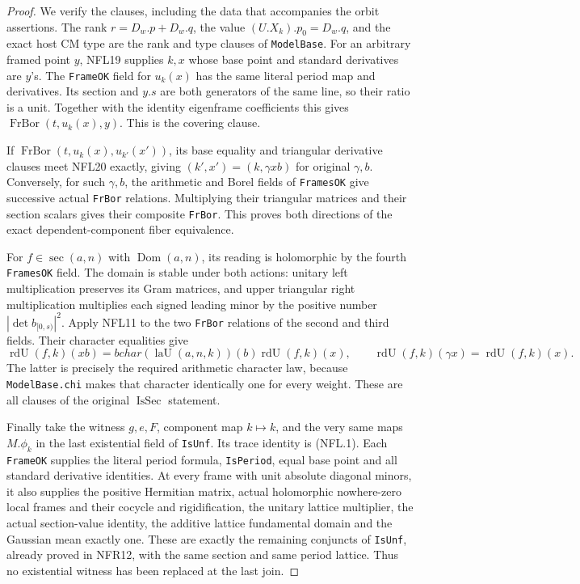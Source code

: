 \begin{proof}
We verify the clauses, including the data that accompanies the
orbit assertions.  The rank $r=D_w.p+D_w.q$, the value
$(U.X_k).p_0=D_w.q$, and the exact host CM type are the rank
and type clauses of \texttt{ModelBase}.
For an arbitrary framed point $y$, NFL19 supplies $k,x$ whose
base point and standard derivatives are $y$'s.  The
\texttt{FrameOK} field for $u_k(x)$ has the same literal
period map and derivatives.  Its section and $y.s$ are both
generators of the same line, so their ratio is a unit.
Together with the identity eigenframe coefficients this gives
$\operatorname{FrBor}(t,u_k(x),y)$.  This is the covering clause.

If $\operatorname{FrBor}(t,u_k(x),u_{k'}(x'))$, its base equality
and triangular derivative clauses meet NFL20 exactly, giving
$(k',x')=(k,\gamma xb)$ for original $\gamma,b$.
Conversely, for such $\gamma,b$, the arithmetic and Borel
fields of \texttt{FramesOK} give successive actual
\texttt{FrBor} relations.  Multiplying their triangular
matrices and their section scalars gives their composite
\texttt{FrBor}.  This proves both directions of the exact
dependent-component fiber equivalence.

For $f\in\operatorname{sec}(a,n)$ with $\operatorname{Dom}(a,n)$,
its reading is holomorphic by the fourth \texttt{FramesOK}
field.  The domain is stable under both actions: unitary
left multiplication preserves its Gram matrices, and upper
triangular right multiplication multiplies each signed leading
minor by the positive number $|\det b_{[0,s)}|^2$.
Apply NFL11 to the two \texttt{FrBor} relations of the second
and third fields.  Their character equalities give
\[
 \operatorname{rdU}(f,k)(xb)=bchar(\operatorname{laU}(a,n,k))(b)
                              \operatorname{rdU}(f,k)(x),
 \qquad
 \operatorname{rdU}(f,k)(\gamma x)=\operatorname{rdU}(f,k)(x).
 \tag{NFL.28}
\]
The latter is precisely the required arithmetic character law,
because \texttt{ModelBase.chi} makes that character identically
one for every weight.  These are all clauses of the original
$\operatorname{IsSec}$ statement.

Finally take the witness $g,e,F$, component map $k\mapsto k$,
and the very same maps $M.\phi_k$ in the last existential field
of \texttt{IsUnf}.  Its trace identity is (NFL.1).  Each
\texttt{FrameOK} supplies the literal period formula,
\texttt{IsPeriod}, equal base point and all standard derivative
identities.  At every frame with unit absolute diagonal minors,
it also supplies the positive Hermitian matrix, actual
holomorphic nowhere-zero local frames and their cocycle and
rigidification, the unitary lattice multiplier, the actual
section-value identity, the additive lattice fundamental
domain and the Gaussian mean exactly one.  These are exactly
the remaining conjuncts of \texttt{IsUnf}, already proved in
NFR12, with the same section and same period lattice.  Thus no
existential witness has been replaced at the last join.
\end{proof}

